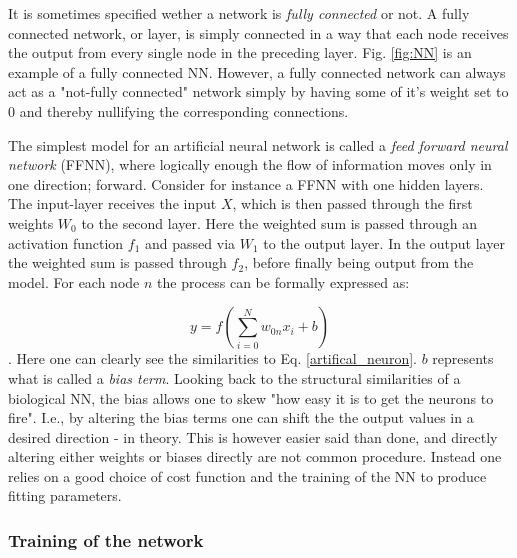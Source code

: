 It is sometimes specified wether a network is \textit{fully connected} or not. A fully connected network, or layer, is simply connected in a way that each node receives the output from every single node in the preceding layer. Fig. \ref{fig:NN} is an example of a fully connected NN. However, a fully connected network can always act as a "not-fully connected" network simply by having some of it's weight set to $0$ and thereby nullifying the corresponding connections. 

The simplest model for an artificial neural network is called a \textit{feed forward neural network} (FFNN), where logically enough the flow of information moves only in one direction; forward. Consider for instance a FFNN with one hidden layers. The input-layer receives the input $X$, which is then passed through the first weights $W_0$ to the second layer. Here the weighted sum is passed through an activation function $f_1$ and passed via $W_1$ to the output layer. In the output layer the weighted sum is passed through $f_2$, before finally being output from the model. 
For each node $n$ the process can be formally expressed as:


\begin{equation}
    y = f\left( \sum_{i=0}^N w_{0n}x_i + b\right)
\end{equation}
\citep[p.17]{Ketkar2017}. Here one can clearly see the similarities to Eq. \ref{artifical_neuron}. $b$ represents what is called a \textit{bias term}. Looking back to the structural similarities of a biological NN, the bias allows one to skew "how easy it is to get the neurons to fire". I.e., by altering the bias terms one can shift the the output values in a desired direction - in theory. This is however easier said than done, and directly altering either weights or biases directly are not common procedure. Instead one relies on a good choice of cost function and the training of the NN to produce fitting parameters. 


\subsubsection{Training of the network}

